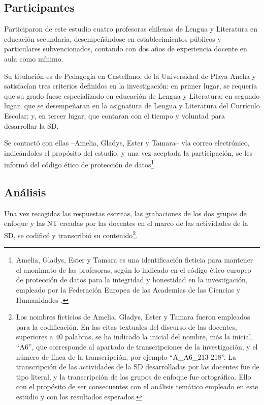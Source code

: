 \documentclass[spanish]{textolivre}
\begin{document}
\subsection{Participantes}\label{sec-organizacao-latex}
Participaron de este estudio cuatro profesoras chilenas de Lengua y Literatura en educación secundaria, desempeñándose en establecimientos públicos y particulares subvencionados, contando con dos años de experiencia docente en aula como mínimo. 

Su titulación es de Pedagogía en Castellano, de la Universidad de Playa Ancha y satisfacían tres criterios definidos en la investigación: en primer lugar, se requería que su grado fuese especializado en educación de Lengua y Literatura; en segundo lugar, que se desempeñaran en la asignatura de Lengua y Literatura del Currículo Escolar; y, en tercer lugar, que contaran con el tiempo y voluntad para desarrollar la SD.

Se contactó con ellas –Amelia, Gladys, Ester y Tamara– vía correo electrónico, indicándoles el propósito del estudio, y una vez aceptada la participación, se les informó del código ético de protección de datos\footnote{Amelia, Gladys, Ester y Tamara es una identificación ficticia para mantener el anonimato de las profesoras, según lo indicado en el código ético europeo de protección de datos para la integridad y honestidad en la investigación, empleado por la Federación Europea de las Academias de las Ciencias y Humanidades \cite{all_european_academies_allea_codigo_2018}.}.

\subsection{Análisis}\label{sec-titulo}
Una vez recogidas las respuestas escritas, las grabaciones de los dos grupos de enfoque y las NT creadas por las docentes en el marco de las actividades de la SD, se codificó y transcribió su contenido\footnote{Los nombres ficticios de Amelia, Gladys, Ester y Tamara fueron empleados para la codificación. En las citas textuales del discurso de las docentes, superiores a 40 palabras, se ha indicado la inicial del nombre, más la inicial, “A6”, que corresponde al apartado de transcripciones de la investigación, y el número de línea de la transcripción, por ejemplo “A\_A6\_213-218”. La transcripción de las actividades de la SD desarrolladas por las docentes fue de tipo literal, y la transcripción de los grupos de enfoque fue ortográfica. Ello con el propósito de ser consecuentes con el análisis temático empleado en este estudio y con los resultados esperados.}.
\end{document}
